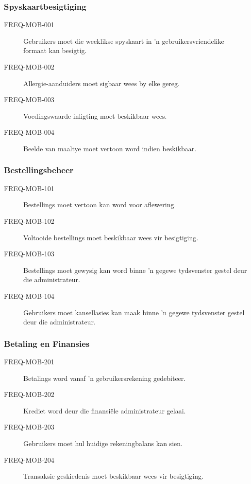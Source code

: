 \subsubsection{Spyskaartbesigtiging}
\begin{description}
  \item[FREQ-MOB-001] Gebruikers moet die weeklikse spyskaart in 'n gebruikersvriendelike formaat kan besigtig.
  \item[FREQ-MOB-002] Allergie-aanduiders moet sigbaar wees by elke gereg.
  \item[FREQ-MOB-003] Voedingswaarde-inligting moet beskikbaar wees.
  \item[FREQ-MOB-004] Beelde van maaltye moet vertoon word indien beskikbaar.
\end{description}

\subsubsection{Bestellingsbeheer}
\begin{description}
  \item[FREQ-MOB-101] Bestellings moet vertoon kan word voor aflewering.
  \item[FREQ-MOB-102] Voltooide bestellings moet beskikbaar wees vir besigtiging.
  \item[FREQ-MOB-103] Bestellings moet gewysig kan word binne 'n gegewe tydsvenster gestel deur die administrateur.
  \item[FREQ-MOB-104] Gebruikers moet kansellasies kan maak binne 'n gegewe tydsvenster gestel deur die administrateur.
\end{description}

\subsubsection{Betaling en Finansies}
\begin{description}
  \item[FREQ-MOB-201] Betalings word vanaf 'n gebruikersrekening gedebiteer.
  \item[FREQ-MOB-202] Krediet word deur die finansiële administrateur gelaai.
  \item[FREQ-MOB-203] Gebruikers moet hul huidige rekeningbalans kan sien.
  \item[FREQ-MOB-204] Transaksie geskiedenis moet beskikbaar wees vir besigtiging.
\end{description}


